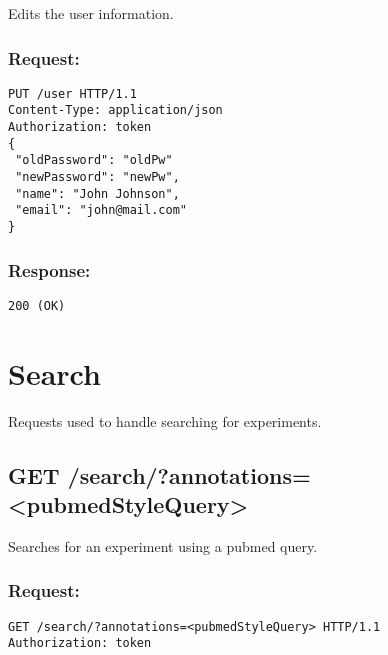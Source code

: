 Edits the user information.

\subsubsection*{Request:}
\begin{verbatim}
PUT /user HTTP/1.1
Content-Type: application/json
Authorization: token
{
 "oldPassword": "oldPw"
 "newPassword": "newPw",
 "name": "John Johnson",
 "email": "john@mail.com"
}
\end{verbatim}


\subsubsection*{Response:}
\begin{verbatim}
200 (OK)
\end{verbatim}

\section*{Search}

Requests used to handle searching for experiments.

\subsection*{GET /search/?annotations=<pubmedStyleQuery>}

Searches for an experiment using a pubmed query.

\subsubsection*{Request:}
\begin{verbatim}
GET /search/?annotations=<pubmedStyleQuery> HTTP/1.1
Authorization: token
\end{verbatim}

